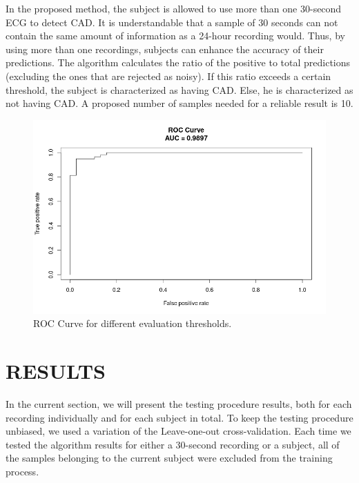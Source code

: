 In the proposed method, the subject is allowed to use more than one 30-second ECG to detect CAD. It is understandable that a sample of 30 seconds can not contain the same amount of information as a 24-hour recording would. Thus, by using more than one recordings, subjects can enhance the accuracy of their predictions. The algorithm calculates the ratio of the positive to total predictions (excluding the ones that are rejected as noisy). If this ratio exceeds a certain threshold, the subject is characterized as having CAD. Else, he is characterized as not having CAD. A proposed number of samples needed for a reliable result is 10.

\begin{figure}[htb]

\centering
\includegraphics[width=0.9\columnwidth]{roc_black_white.png}

\caption{ROC Curve for different evaluation thresholds.}
\label{fig:roc}
%
\end{figure}



\section{RESULTS}
\label{sec:results}

In the current section, we will present the testing procedure results, both for each recording individually and for each subject in total. To keep the testing procedure unbiased, we used a variation of the Leave-one-out cross-validation. Each time we tested the algorithm results for either a 30-second recording or a subject, all of the samples belonging to the current subject were excluded from the training process.

